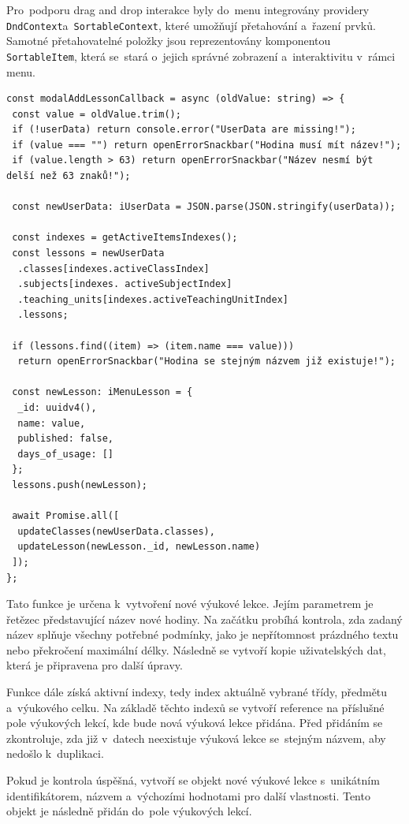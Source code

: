 \documentclass[male,czech,api_bc]{kitheses}
\begin{document}
Pro~podporu drag and drop interakce byly do~menu integrovány providery \texttt{DndContext}\break a~\texttt{SortableContext}, které umožňují přetahování a~řazení prvků. Samotné přetahovatelné položky jsou reprezentovány komponentou \texttt{SortableItem}, která se~stará o~jejich správné zobrazení a~interaktivitu v~rámci menu.

\begin{lstlisting}
const modalAddLessonCallback = async (oldValue: string) => {
 const value = oldValue.trim();
 if (!userData) return console.error("UserData are missing!");
 if (value === "") return openErrorSnackbar("Hodina musí mít název!");
 if (value.length > 63) return openErrorSnackbar("Název nesmí být delší než 63 znaků!");

 const newUserData: iUserData = JSON.parse(JSON.stringify(userData));
	
 const indexes = getActiveItemsIndexes();
 const lessons = newUserData
  .classes[indexes.activeClassIndex]
  .subjects[indexes. activeSubjectIndex]
  .teaching_units[indexes.activeTeachingUnitIndex]
  .lessons;
	
 if (lessons.find((item) => (item.name === value)))
  return openErrorSnackbar("Hodina se stejným názvem již existuje!");
	
 const newLesson: iMenuLesson = {
  _id: uuidv4(),
  name: value,
  published: false,
  days_of_usage: []
 };
 lessons.push(newLesson);

 await Promise.all([
  updateClasses(newUserData.classes),
  updateLesson(newLesson._id, newLesson.name)
 ]);
};
\end{lstlisting}

Tato funkce je určena k~vytvoření nové výukové lekce. Jejím parametrem je řetězec představující název nové hodiny. Na začátku probíhá kontrola, zda zadaný název splňuje všechny potřebné podmínky, jako je nepřítomnost prázdného textu nebo překročení maximální délky. Následně se vytvoří kopie uživatelských dat, která je připravena pro další úpravy.

Funkce dále získá aktivní indexy, tedy index aktuálně vybrané třídy, předmětu a~výukového celku. Na základě těchto indexů se vytvoří reference na příslušné pole výukových lekcí, kde bude nová výuková lekce přidána. Před přidáním se zkontroluje, zda již v~datech neexistuje výuková lekce se~stejným názvem, aby nedošlo k~duplikaci.

Pokud je kontrola úspěšná, vytvoří se objekt nové výukové lekce s~unikátním identifikátorem, názvem a~výchozími hodnotami pro další vlastnosti. Tento objekt je následně přidán do~pole výukových lekcí.
\end{document}

